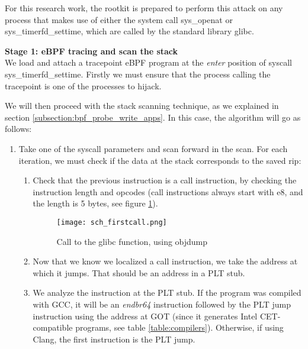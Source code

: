 For this research work, the rootkit is prepared to perform this attack on any process that makes use of either the system call sys\_openat or sys\_timerfd\_settime, which are called by the standard library glibc.

\textbf{Stage 1: eBPF tracing and scan the stack}\\
We load and attach a tracepoint eBPF program at the \textit{enter} position of syscall sys\_timerfd\_settime. Firstly we must ensure that the process calling the tracepoint is one of the processes to hijack.

We will then proceed with the stack scanning technique, as we explained in section \ref{subsection:bpf_probe_write_apps}. In this case, the algorithm will go as follows:
\begin{enumerate}
\item Take one of the syscall parameters and scan forward in the scan. For each iteration, we must check if the data at the stack corresponds to the saved rip:
\begin{enumerate}
\item Check that the previous instruction is a call instruction, by checking the instruction length and opcodes (call instructions always start with e8, and the length is 5 bytes, see figure \ref{fig:firstcall}).
\begin{figure}[H]
	\centering
	\texttt{[image: sch\_firstcall.png]}
	\caption{Call to the glibc function, using objdump}
	\label{fig:firstcall}
\end{figure}
\item Now that we know we localized a call instruction, we take the address at which it jumps. That should be an address in a PLT stub.
\item We analyze the instruction at the PLT stub. If the program was compiled with GCC, it will be an \textit{endbr64} instruction followed by the PLT jump instruction using the address at GOT (since it generates Intel CET-compatible programs, see table \ref{table:compilers}). Otherwise, if using Clang, the first instruction is the PLT jump.
\end{enumerate}
\end{enumerate}